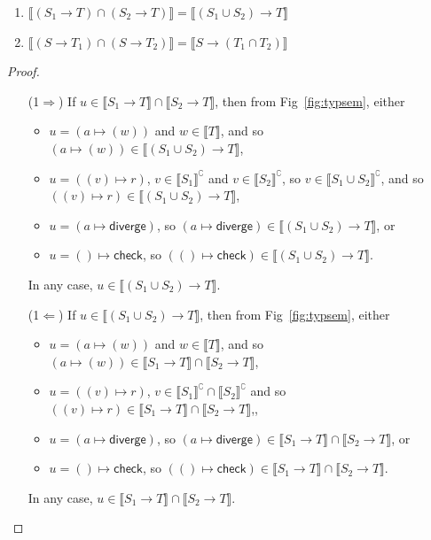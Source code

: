 \documentclass[acmsmall,review,screen]{acmart}
\newcommand{\DIVERGE}{\mathsf{diverge}}
\newcommand{\CHECK}{\mathsf{check}}
\newcommand{\fun}{\mathbin{\rightarrow}}
\newcommand{\sem}[1]{\llbracket{#1}\rrbracket}
\newcommand{\nsem}[1]{\llbracket{#1}\rrbracket^\complement}
\begin{document}
\begin{lemma} \mbox{}
  \begin{enumerate}
  \item $\sem{(S_1 \fun T) \cap (S_2 \fun T)} =
    \sem{(S_1 \cup S_2) \fun T}$
  \item $\sem{(S \fun T_1) \cap (S \fun T_2)} =
   \sem{S \fun (T_1 \cap T_2)}$
  \end{enumerate}
\end{lemma}
\begin{proof} \mbox{}
  \begin{enumerate}
    \item[(1$\Rightarrow$)]
  If $u \in \sem{S_1 \fun T} \cap \sem{S_2 \fun T}$,
  then from Fig~\ref{fig:typsem}, either
  \begin{itemize}
  \item $u = (a \mapsto (w))$ and $w \in \sem{T}$, 
    and so $(a \mapsto (w)) \in \sem{(S_1 \cup S_2) \fun T}$,
  \item $u = ((v) \mapsto r)$, $v \in \nsem{S_1}$
    and $v \in \nsem{S_2}$,
    so $v \in \nsem{S_1 \cup S_2}$,
    and so $((v) \mapsto r) \in \sem{(S_1 \cup S_2) \fun T}$,
  \item $u = (a \mapsto \DIVERGE)$, so $(a \mapsto \DIVERGE) \in \sem{(S_1 \cup S_2) \fun T}$, or
  \item $u = () \mapsto \CHECK$, so $(() \mapsto \CHECK) \in \sem{(S_1 \cup S_2) \fun T}$.
  \end{itemize}
  In any case, $u \in \sem{(S_1 \cup S_2) \fun T}$.

    \item[(1$\Leftarrow$)]
  If $u \in \sem{(S_1 \cup S_2) \fun T}$,
  then from Fig~\ref{fig:typsem}, either
  \begin{itemize}
  \item $u = (a \mapsto (w))$ and $w \in \sem{T}$, 
    and so $(a \mapsto (w)) \in \sem{S_1 \fun T} \cap \sem{S_2 \fun T}$,
  \item $u = ((v) \mapsto r)$, $v \in \nsem{S_1} \cap \nsem{S_2}$
    and so $((v) \mapsto r) \in \sem{S_1 \fun T} \cap \sem{S_2 \fun T}$,,
  \item $u = (a \mapsto \DIVERGE)$, so $(a \mapsto \DIVERGE) \in \sem{S_1 \fun T} \cap \sem{S_2 \fun T}$, or
  \item $u = () \mapsto \CHECK$, so $(() \mapsto \CHECK) \in \sem{S_1 \fun T} \cap \sem{S_2 \fun T}$.
  \end{itemize}
  In any case, $u \in \sem{S_1 \fun T} \cap \sem{S_2 \fun T}$.


\end{enumerate}
\end{proof}
\end{document}
